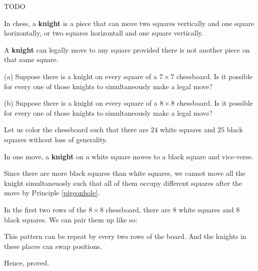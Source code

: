 \begin{solution}
	TODO
\end{solution}

\begin{problem}
	In chess, a \textbf{knight} is a piece that can move two squares vertically and one square horizontally, or two squares horizontall and one square vertically.

	A \textbf{knight} can legally move to any square provided there is not another piece on that same square.

	(a) Suppose there is a knight on every square of a $7 \times 7$ chessboard. Is it possible for every one of those knights to simultaneously make a legal move?

	(b) Suppose there is a knight on every square of a $8 \times 8$ chessboard. Is it possible for every one of those knights to simultaneously make a legal move?
\end{problem}


\begin{solution}[a]
Let us color the chessboard such that there are $24$ white squares and $25$ black squares without loss of generality.

In one move, a \textbf{knight} on a white square moves to a black square and vice-verse.

Since there are more black squares than white squares, we cannot move all the knight simultaneuosly such that all of them occupy different squares after the move by Principle \ref{pigeonhole}.
\end{solution}

\begin{solution}[b]
	In the first two rows of the $8 \times 8$ chessboard, there are $8$ white squares and $8$ black squares. We can pair them up like so:
\bigbreak


This pattern can be repeat by every two rows of the board. And the knights in these places can swap positions.

Hence, proved.

\end{solution}

